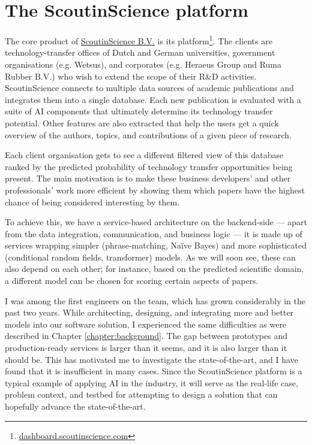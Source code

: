 \chapter{The ScoutinScience platform} \label{chapter:case}

The core product of \href{https://scoutinscience.com/}{ScoutinScience B.V.} is its platform\footnote{\href{https://dashboard.scoutinscience.com/}{dashboard.scoutinscience.com}}. The clients are technology-transfer offices of Dutch and German universities, government organisations (e.g. Wetsus), and corporates (e.g. Heraeus Group and Ruma Rubber B.V.) who wish to extend the scope of their R\&D activities. ScoutinScience connects to multiple data sources of academic publications and integrates them into a single database. Each new publication is evaluated with a suite of AI components that ultimately determine its technology transfer potential. Other features are also extracted that help the users get a quick overview of the authors, topics, and contributions of a given piece of research.

Each client organisation gets to see a different filtered view of this database ranked by the predicted probability of technology transfer opportunities being present. The main motivation is to make these business developers' and other professionals' work more efficient by showing them which papers have the highest chance of being considered interesting by them. 

To achieve this, we have a service-based architecture \cite{kleppmann2017designing} on the backend-side --- apart from the data integration, communication, and business logic --- it is made up of services wrapping simpler (phrase-matching, Naïve Bayes) and more sophisticated (conditional random fields, transformer) models. As we will soon see, these can also depend on each other; for instance, based on the predicted scientific domain, a different model can be chosen for scoring certain aspects of papers.

I was among the first engineers on the team, which has grown considerably in the past two years. While architecting, designing, and integrating more and better models into our software solution, I experienced the same difficulties as were described in Chapter \ref{chapter:background}. The gap between prototypes and production-ready services is larger than it seems, and it is also larger than it should be. This has motivated me to investigate the state-of-the-art, and I have found that it is insufficient in many cases. Since the ScoutinScience platform is a typical example of applying AI in the industry, it will serve as the real-life case, problem context, and testbed for attempting to design a solution that can hopefully advance the state-of-the-art.

